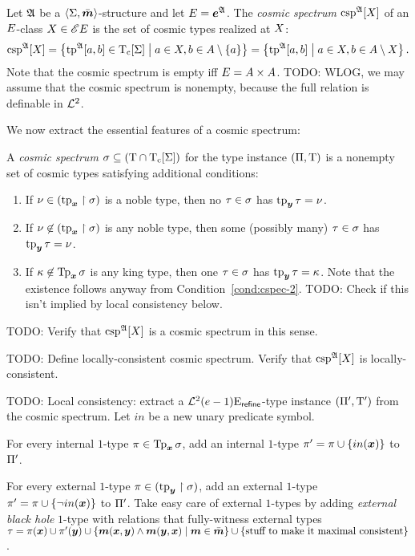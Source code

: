 \begin{definition}
Let $\mathfrak{A}$ be a $\left\langle \mathrm{\Sigma},\bar{\bm{m}} \right\rangle$-structure and let $E = \bm{e}^{\mathfrak{A}}$.
The \emph{cosmic spectrum} $\operatorname{csp}^{\mathfrak{A}}[X]$ of an $E$-class
$X \in {\mathscr{E}E}$ is the set of cosmic types realized at $X$:
\[
  \operatorname{csp}^{\mathfrak{A}}[X] = \left\{\operatorname{tp}^{\mathfrak{A}}[a,b] \in \mathrm{T}_{\mathrm{c}}[\mathrm{\Sigma}]\mathrel{}\middle|\mathrel{}a\in X, b 
  \in A\setminus\left\{a\right\}\right\} = \left\{\operatorname{tp}^{\mathfrak{A}}[a,b]\mathrel{}\middle|\mathrel{}a \in X, b \in
  A \setminus X\right\}.
\]
Note that the cosmic spectrum is empty iff $E = A\times A$.
TODO: WLOG, we may assume that the cosmic spectrum is nonempty, because the
full relation is definable in $\mathcal{L}^{2}$.
\end{definition}
We now extract the essential features of a cosmic spectrum:
\begin{definition}
A \emph{cosmic spectrum} $\sigma \subseteq (\mathrm{T} \cap \mathrm{T}_{\mathrm{c}}[\mathrm{\Sigma}])$ for the
type instance $(\Pi,\mathrm{T})$ is a nonempty set of cosmic types satisfying
additional conditions:
\begin{enumerate}
  \item\label{cond:cspec-1} If $\nu \in (\operatorname{tp}_{\bm{x}}\restriction\sigma)$ is a noble
  type, then no $\tau \in \sigma$ has $\operatorname{tp}_{\bm{y}}\tau = \nu$.
  \item\label{cond:cspec-2} If $\nu \not\in (\operatorname{tp}_{\bm{x}}\restriction\sigma)$ is any
  noble type, then some (possibly many) $\tau \in \sigma$ has $\operatorname{tp}_{\bm{y}}\tau =
  \nu$.
  \item\label{cond:cspec-3} If $\kappa \not\in \operatorname{Tp}_{\bm{x}}\sigma$ is any king type, then
  one $\tau \in \sigma$ has $\operatorname{tp}_{\bm{y}}\tau = \kappa$. Note that the existence follows
  anyway from Condition~\ref{cond:cspec-2}. TODO: Check if this isn't implied by
  local consistency below.
\end{enumerate}
\end{definition}

TODO: Verify that $\operatorname{csp}^{\mathfrak{A}}[X]$ is a cosmic spectrum in this sense.

TODO: Define locally-consistent cosmic spectrum. Verify that $\operatorname{csp}^{\mathfrak{A}}[X]$
is locally-consistent.

TODO: Local consistency: extract a $\mathcal{L}^{2}_{{}}{(e-1)}\mathrm{E}_{\mathsf{refine}}$-type
instance $(\Pi', \mathrm{T}')$ from the cosmic spectrum. Let $in$ be a new unary
predicate symbol.

For every internal $1$-type $\pi \in \operatorname{Tp}_{\bm{x}}\sigma$, add an internal $1$-type
$\pi' = \pi \cup \left\{in(\bm{x})\right\}$ to $\Pi'$.

For every external $1$-type $\pi \in(\operatorname{tp}_{\bm{y}}\restriction\sigma)$, add an external
$1$-type $\pi' = \pi \cup \left\{\lnot in(\bm{x})\right\}$ to $\Pi'$.
Take easy care of external $1$-types by adding \emph{external black hole}
$1$-type with relations that fully-witness external types $\tau =
\pi(\bm{x}) \cup \pi'(\bm{y}) \cup \left\{\bm{m}(\bm{x},\bm{y}) \land \bm{m}(\bm{y},\bm{x})\mathrel{}\middle|\mathrel{}\bm{m} \in \bar{\bm{m}}\right\} \cup \left\{\text{stuff to make it maximal
consistent}\right\}$.

